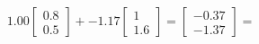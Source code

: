 \documentclass[preview]{standalone}
\begin{document}
\begin{align*}
1.00 \begin{bmatrix} 0.8 \\ 0.5 \end{bmatrix} + -1.17 \begin{bmatrix} 1 \\ 1.6 \end{bmatrix} = \begin{bmatrix} -0.37 \\ -1.37 \end{bmatrix} =
\end{align*}
\end{document}

